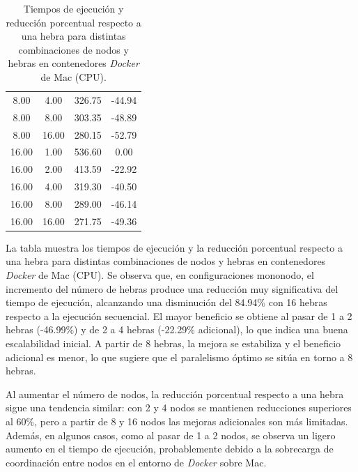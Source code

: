 \begin{table}[ht]
\begin{tabular}{|c|c|c|c|}
        8.00           & 4.00            & 326.75              & -44.94                         \\
        8.00           & 8.00            & 303.35              & -48.89                         \\
        8.00           & 16.00           & 280.15              & -52.79                         \\
        16.00          & 1.00            & 536.60              & 0.00                           \\
        16.00          & 2.00            & 413.59              & -22.92                         \\
        16.00          & 4.00            & 319.30              & -40.50                         \\
        16.00          & 8.00            & 289.00              & -46.14                         \\
        16.00          & 16.00           & 271.75              & -49.36                         \\
        \hline
    \end{tabular}
    \caption{Tiempos de ejecución y reducción porcentual respecto a una hebra para distintas combinaciones de nodos y hebras en contenedores \textit{Docker} de Mac (CPU).}
    \label{tab:thread_sweep_mac_\textit{Docker}_time}
\end{table}

La tabla muestra los tiempos de ejecución y la reducción porcentual respecto a una hebra para distintas combinaciones de nodos y hebras en contenedores \textit{Docker} de Mac (CPU). Se observa que, en configuraciones mononodo, el incremento del número de hebras produce una reducción muy significativa del tiempo de ejecución, alcanzando una disminución del 84.94\% con 16 hebras respecto a la ejecución secuencial. El mayor beneficio se obtiene al pasar de 1 a 2 hebras (-46.99\%) y de 2 a 4 hebras (-22.29\% adicional), lo que indica una buena escalabilidad inicial. A partir de 8 hebras, la mejora se estabiliza y el beneficio adicional es menor, lo que sugiere que el paralelismo óptimo se sitúa en torno a 8 hebras.

Al aumentar el número de nodos, la reducción porcentual respecto a una hebra sigue una tendencia similar: con 2 y 4 nodos se mantienen reducciones superiores al 60\%, pero a partir de 8 y 16 nodos las mejoras adicionales son más limitadas. Además, en algunos casos, como al pasar de 1 a 2 nodos, se observa un ligero aumento en el tiempo de ejecución, probablemente debido a la sobrecarga de coordinación entre nodos en el entorno de \textit{Docker} sobre Mac.

